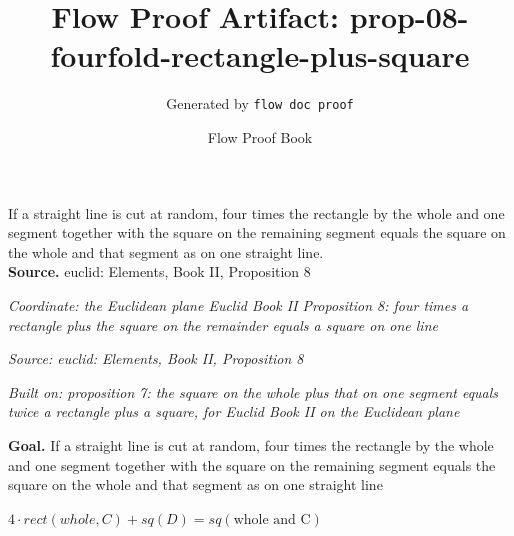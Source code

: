 \documentclass[11pt]{article}
\title{Flow Proof Artifact: prop-08-fourfold-rectangle-plus-square}
\author{Generated by \texttt{flow doc proof}}
\date{Flow Proof Book}
\theoremstyle{definition}
\begin{document}
\maketitle
If a straight line is cut at random, four times the rectangle by the whole and one segment together with the square on the remaining segment equals the square on the whole and that segment as on one straight line.\\[0.5em]
\textbf{Source.} euclid: Elements, Book II, Proposition 8\\[0.5em]
\bigskip
{}\par
\smallskip\noindent\textit{Coordinate: the Euclidean plane \cdot Euclid Book II \cdot Proposition 8: four times a rectangle plus the square on the remainder equals a square on one line}\par
\smallskip\noindent\textit{Source: euclid: Elements, Book II, Proposition 8}\par
\smallskip\noindent\textit{Built on: proposition 7: the square on the whole plus that on one segment equals twice a rectangle plus a square, for Euclid Book II on the Euclidean plane}\par
\medskip
\noindent\textbf{Goal.} If a straight line is cut at random, four times the rectangle by the whole and one segment together with the square on the remaining segment equals the square on the whole and that segment as on one straight line\par
\noindent$\displaystyle 4 \cdot rect(whole, C) + sq(D) = sq(\text{whole and C})$\par
\medskip
\noindent
\end{document}

